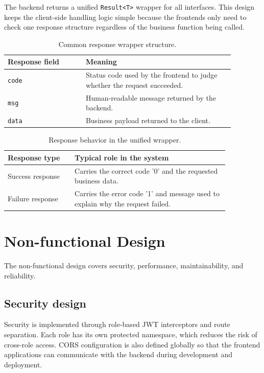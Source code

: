 \documentclass[12pt,a4paper]{article}
\begin{document}
The backend returns a unified \texttt{Result<T>} wrapper for all interfaces. This design keeps the client-side handling logic simple because the frontends only need to check one response structure regardless of the business function being called.

\begin{table}[H]
\centering
\begin{tabular}{p{0.30\linewidth} p{0.58\linewidth}}
\toprule
\textbf{Response field} & \textbf{Meaning} \\
\midrule
\texttt{code} & Status code used by the frontend to judge whether the request succeeded. \\
\texttt{msg} & Human-readable message returned by the backend. \\
\texttt{data} & Business payload returned to the client. \\
\bottomrule
\end{tabular}
\caption{Common response wrapper structure.}
\end{table}

\begin{table}[H]
\centering
\begin{tabular}{p{0.26\linewidth} p{0.60\linewidth}}
\toprule
\textbf{Response type} & \textbf{Typical role in the system} \\
\midrule
Success response & Carries the correct code '0' and the requested business data. \\
Failure response & Carries the error code '1' and message used to explain why the request failed. \\
\bottomrule
\end{tabular}
\caption{Response behavior in the unified wrapper.}
\end{table}

\section{Non-functional Design}

The non-functional design covers security, performance, maintainability, and reliability.

\subsection{Security design}

Security is implemented through role-based JWT interceptors and route separation. Each role has its own protected namespace, which reduces the risk of cross-role access. CORS configuration is also defined globally so that the frontend applications can communicate with the backend during development and deployment.
\end{document}

